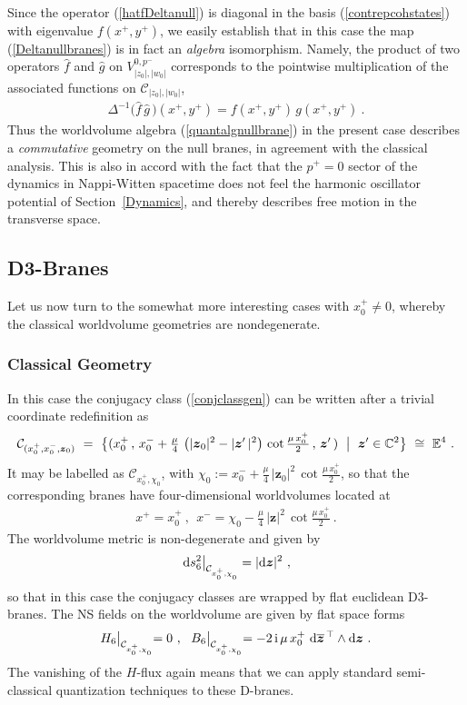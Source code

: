 \documentclass[11pt,a4paper]{article}
\newcommand{\ii}{{\rm i}}
\newcommand{\mbf}[1]{{\boldsymbol {#1} }}
\def\ii{{\,{\rm i}\,}}
\def\dd{{\rm d}}
\def\mz{{\mbf z}}
\newcommand{\complex}{{\mathbb C}} %
\newcommand{\eucl}{{\mathbb E}}
\newcommand{\beq}{\begin{eqnarray}}
\newcommand{\eeq}{\end{eqnarray}}
\begin{document}
Since the operator (\ref{hatfDeltanull}) is diagonal in the basis
(\ref{contrepcohstates}) with eigenvalue $f(x^+,y^+)$, we easily
establish that in this case the map (\ref{Deltanullbranes})
is in fact an {\it algebra} isomorphism. Namely, the product of two
operators $\hat f$ and $\hat g$ on $V_{|z_0|,|w_0|}^{0,p^-}$
corresponds to the pointwise multiplication of the associated
functions on $\mathcal{C}_{|z_0|,|w_0|}$,
\beq
\Delta^{-1}\bigl(\hat f\,\hat g\,\bigr)\left(x^+,y^+\right)=
f\left(x^+,y^+\right)\,g\left(x^+,y^+\right) \ .
\label{commprodnull}\eeq
Thus the worldvolume algebra (\ref{quantalgnullbrane}) in the present
case describes a {\it commutative} geometry on the null branes, in
agreement with the classical analysis. This is also in accord with the
fact that the $p^+=0$ sector of the dynamics in Nappi-Witten spacetime
does not feel the harmonic oscillator potential of
Section~\ref{Dynamics}, and thereby describes free motion in the
transverse space.

\subsection{D3-Branes\label{CGED3B}}

Let us now turn to the somewhat more interesting cases with
$x_0^+\neq0$, whereby the classical worldvolume geometries are
nondegenerate.

\subsubsection*{Classical Geometry}

In this case the conjugacy class (\ref{conjclassgen}) can be written
after a trivial coordinate redefinition as
\beq
\mathcal{C}_{(x_0^+,x_0^-,\mz_0)}~=~
\bigl\{(x_0^+\,,\,x_0^-+\mbox{$\frac\mu4$}\,\left(|\mz_0|^2-|\mz'\,|^2
\right)\,\cot\mbox{$\frac{\mu\,x_0^+}2$}\,,\,\mz'\,)~\bigm|~\mz'
\in\complex^2\bigr\}~\cong~\eucl^4 \ .
\label{conjpieucl4}\eeq
It may be labelled as $\mathcal{C}_{x_0^+,\chi^{~}_0}$, with
$\chi^{~}_0:=x_0^-+\frac\mu4\,|\mz_0|^2\,\cot\frac{\mu\,x_0^+}2$, so
that the corresponding branes have four-dimensional worldvolumes
located at
\beq
x^+=x_0^+ \ , ~~ x^-=\chi^{~}_0-\mbox{$\frac{\mu}4$}\,
|\mz|^2\,\cot\mbox{$\frac{\mu\,x_0^+}2$} \ .
\label{E4branesloc}\eeq
The worldvolume metric is non-degenerate and given by
\beq
\left.\dd s_6^2\right|_{\mathcal{C}_{x_0^+,\chi_0^{~}}}=|\dd\mz|^2 \ ,
\label{metricpieucl4}\eeq
so that in this case the conjugacy classes are wrapped by flat euclidean
D3-branes. The NS fields on the worldvolume are given by flat space
forms
\beq
H_6\bigl|_{\mathcal{C}_{x_0^+,\chi_0^{~}}}=0 \ , ~~
B_6\bigl|_{\mathcal{C}_{x_0^+,\chi^{~}_0}}=-2\ii\mu\,
x_0^+~\dd\overline{\mz}^{\,\top}\wedge\dd\mz \ .
\label{NSconj}\eeq
The vanishing of the $H$-flux again means that we can apply standard
semi-classical quantization techniques to these D-branes.
\end{document}
